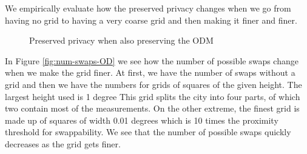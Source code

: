 \documentclass[times,twocolumn,final,authoryear]{elsarticle}
\begin{document}
We empirically evaluate how the preserved privacy changes when we go from having
no grid to having a very coarse grid and then making it finer and
finer.

\begin{figure}
\centering
  \caption{Preserved privacy when also preserving the ODM}
  \label{fig:OD}
\end{figure}

In Figure \ref{fig:num-swaps-OD} we see how the number of possible
swaps change when we make the grid finer. At first, we have the number
of swaps without a grid and then we have the numbers for grids of
squares of the given height. The largest height used is 1 degree
This grid splits the city into four parts, of which two contain
most of the measurements. On the other extreme, the finest grid is made up of squares of width 0.01 degrees which is 10 times the proximity threshold for swappability.  
We see that the number of possible swaps quickly decreases as the grid
gets finer. 
\end{document}
